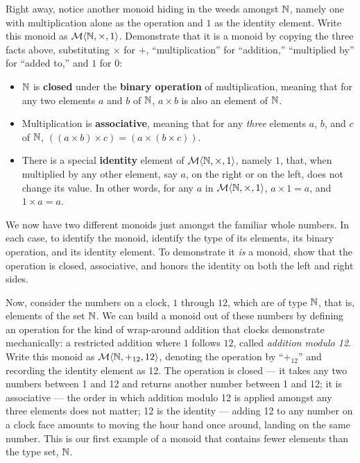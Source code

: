 Right away, notice another monoid hiding in the weeds amongst $\mathbb{N}$, namely one with multiplication alone as the operation and $1$ as the identity element. Write this monoid as $\mathcal{M}\langle{\mathbb{N}},{\times},{1}\rangle$. Demonstrate that it is a monoid by copying the three facts above, substituting $\times$ for $+$, ``multiplication'' for ``addition,'' ``multiplied by'' for ``added to,'' and $1$ for $0$:
\begin{itemize}
  \item $\mathbb{N}$ is \textbf{closed} under the \textbf{binary operation} of multiplication, meaning that for any two elements $a$ and $b$ of $\mathbb{N}$, $a\times b$ is also an element of $\mathbb{N}$.
	\item Multiplication is \textbf{associative}, meaning that for any \emph{three} elements $a$, $b$, and $c$ of $\mathbb{N}$, $((a\times b)\times c)=(a\times (b\times c))$. 
	\item There is a special \textbf{identity} element of $\mathcal{M}\langle{\mathbb{N}},{\times},{1}\rangle$, namely $1$, that, when multiplied by any other element, say $a$, on the right or on the left, does not change its value. In other words, for any $a$ in $\mathcal{M}\langle{\mathbb{N}},{\times},{1}\rangle$, $a\times 1=a$, and $1\times a=a$.
\end{itemize}


We now have two different monoids just amongst the familiar whole numbers. In each case, to identify the monoid, identify the type of its elements, its binary operation, and its identity element. To demonstrate it \emph{is} a monoid, show that the operation is closed, associative, and honors the identity on both the left and right sides.


Now, consider the numbers on a clock, $1$ through $12$, which are of type $\mathbb{N}$, that is, elements of the set $\mathbb{N}$. We can build a monoid out of these numbers by defining an operation for the kind of wrap-around addition that clocks demonstrate mechanically: a restricted addition where $1$ follows $12$, called \emph{addition modulo 12}. Write this monoid as $\mathcal{M}\langle{\mathbb{N}},{+_{12}},{12}\rangle$, denoting the operation by ``$+_{12}$'' and recording the identity element as 12. The operation is closed --- it takes any two numbers between 1 and 12 and returns another number between 1 and 12; it is associative --- the order in which addition modulo 12 is applied amongst any three elements does not matter; 12 is the identity --- adding 12 to any number on a clock face amounts to moving the hour hand once around, landing on the same number. This is our first example of a monoid that contains fewer elements than the type set, $\mathbb{N}$.


